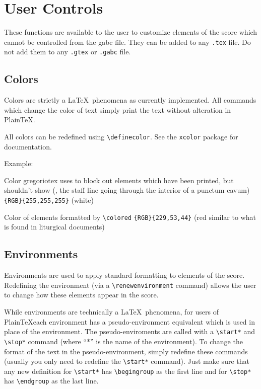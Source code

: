 \section{User Controls}

These functions are available to the user to customize elements of the
score which cannot be controlled from the gabc file. They can be added
to any \verb=.tex= file. Do not add them to any \verb=.gtex= or
\verb=.gabc= file.

\subsection{Colors}

Colors are strictly a \LaTeX\ phenomena as currently implemented.  All
commands which change the color of text simply print the text without
alteration in Plain\TeX.

All colors can be redefined using \verb=\definecolor=.  See the
\verb=xcolor= package for documentation.

Example:\par\medskip
\begin{latexcode}
\end{latexcode}

Color gregoriotex uses to block out elements which have been printed,
but shouldn't show (\eg, the staff line going through the interior of
a punctum cavum) \verb={RGB}{255,255,255}= (white)

Color of elements formatted by \verb=\colored= \verb={RGB}{229,53,44}=
(red similar to what is found in liturgical documents)

\subsection{Environments}

Environments are used to apply standard formatting to elements of the
score.  Redefining the environment (via a \verb=\renewenvironment=
command) allows the user to change how these elements appear in the
score.

While environments are technically a \LaTeX\ phenomena, for users of
Plain\TeX each environment has a pseudo-environment equivalent which is
used in place of the environment.  The pseudo-enviroments are called
with a \verb=\start*= and \verb=\stop*= command (where ``*'' is the
name of the environment).  To change the format of the text in the
pseudo-environment, simply redefine these commands (usually you only
need to redefine the \verb=\start*= command).  Just make sure that any
new definition for \verb=\start*= has \verb=\begingroup= as the first
line and for \verb=\stop*= has \verb=\endgroup= as the last line.

